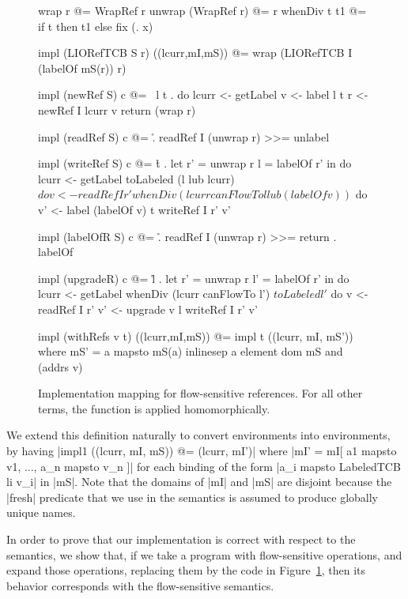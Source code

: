 \begin{figure}
\small
\begin{code}
wrap r @= WrapRef r
unwrap (WrapRef r) @= r
whenDiv t t1 @= if t then t1 else fix (\x. x)

impl (LIORefTCB S r) ((lcurr,mI,mS)) @= wrap (LIORefTCB I (labelOf mS(r)) r)

impl (newRef S) c @= \ l t . do
  lcurr  <- getLabel
  v      <- label l t
  r      <- newRef I lcurr v
  return (wrap r)


impl (readRef S) c @= \r . readRef I (unwrap r) >>= unlabel


impl (writeRef S) c @= \r t . let  r'  = unwrap r
                                   l   = labelOf r' in do
  lcurr <- getLabel
  toLabeled (l lub lcurr) $ do
     v   <- readRef I r'
     whenDiv (lcurr canFlowTo l lub (labelOf v)) $ do
       v'  <- label (labelOf v) t
       writeRef I r' v'


impl (labelOfR S) c @= \r . readRef I (unwrap r) >>= return . labelOf

impl (upgradeR) c @= \r l . let  r'  = unwrap r
                                 l'  = labelOf r' in do
  lcurr <- getLabel
  whenDiv (lcurr canFlowTo l') $ toLabeled l' $ do
     v   <- readRef I r'
     v'  <- upgrade v l
     writeRef I r' v'

impl (withRefs v t) ((lcurr,mI,mS)) @= impl t ((lcurr, mI, mS'))
   where
    mS'  = {a mapsto mS(a) inlinesep a element dom mS and (addrs v) }

\end{code}
\caption{Implementation mapping for flow-sensitive references. For all other terms, the function is applied homomorphically.\label{fig:fs-exts-semantics-impl}}
\end{figure}

We extend this definition naturally to convert \liofs{} environments
into \lio{} environments, by having |impl1 ((lcurr, mI, mS)) @=
(lcurr, mI')| where |mI' = mI[ a1 mapsto v1, ..., a_n mapsto v_n ]|
for each binding of the form |a_i mapsto LabeledTCB li v_i| in
|mS|. Note that the domains of |mI| and |mS| are disjoint because the
|fresh| predicate that we use in the semantics is assumed to produce
globally unique names.

In order to prove that our implementation is correct with respect to
the semantics, we show that, if we take a program with flow-sensitive
operations, and expand those operations, replacing them by the code in
Figure~\ref{fig:fs-exts-semantics-impl}, then its behavior corresponds
with the flow-sensitive semantics.

